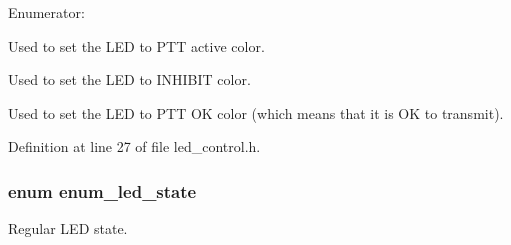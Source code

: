 \begin{Desc}
\item[Enumerator: ]\par
\begin{description}
\item[{\em 
LED\_\-STATE\_\-PTT\_\-ACTIVE\label{led__control_8h_da31a3268524c326594606626e93f39183e0c3f69436aef4771764e85cef0fe1}
}]Used to set the LED to PTT active color. \item[{\em 
LED\_\-STATE\_\-PTT\_\-INHIBIT\label{led__control_8h_da31a3268524c326594606626e93f391d7136a9959d76f279f656e61083898d2}
}]Used to set the LED to INHIBIT color. \item[{\em 
LED\_\-STATE\_\-PTT\_\-OK\label{led__control_8h_da31a3268524c326594606626e93f3910649286809256f7e7cb03616fbbfb550}
}]Used to set the LED to PTT OK color (which means that it is OK to transmit). \end{description}
\end{Desc}



Definition at line 27 of file led\_\-control.h.
\subsubsection[{enum\_\-led\_\-state}]{\setlength{\rightskip}{0pt plus 5cm}enum {\bf enum\_\-led\_\-state}}\label{led__control_8h_f3b2f3268e399a66b018faace7ebb18d}


Regular LED state. 


